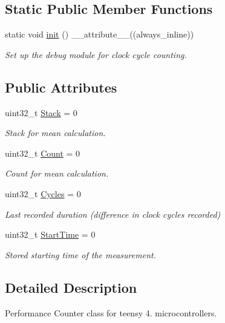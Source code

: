 \subsection*{Static Public Member Functions}
\begin{DoxyCompactItemize}
\item 
static void \hyperlink{classPerfCounter_ae1897d617e84a28c141d554810fcaee9}{init} () \+\_\+\+\_\+attribute\+\_\+\+\_\+((always\+\_\+inline))
\begin{DoxyCompactList}\small\item\em Set up the debug module for clock cycle counting. \end{DoxyCompactList}\end{DoxyCompactItemize}
\subsection*{Public Attributes}
\begin{DoxyCompactItemize}
\item 
uint32\+\_\+t \hyperlink{classPerfCounter_ad440629d44a2bfd9b4d8de185ff66d27}{Stack} = 0
\begin{DoxyCompactList}\small\item\em Stack for mean calculation. \end{DoxyCompactList}\item 
uint32\+\_\+t \hyperlink{classPerfCounter_a8f86300240da2178dea60346ea72651c}{Count} = 0
\begin{DoxyCompactList}\small\item\em Count for mean calculation. \end{DoxyCompactList}\item 
uint32\+\_\+t \hyperlink{classPerfCounter_a60984f26cf145882c0355d28d8233e0a}{Cycles} = 0
\begin{DoxyCompactList}\small\item\em Last recorded duration (difference in clock cycles recorded) \end{DoxyCompactList}\item 
uint32\+\_\+t \hyperlink{classPerfCounter_adefe85b05d9c8920877053f6a8ed743c}{Start\+Time} = 0
\begin{DoxyCompactList}\small\item\em Stored starting time of the measurement. \end{DoxyCompactList}\end{DoxyCompactItemize}


\subsection{Detailed Description}
Performance Counter class for teensy 4. microcontrollers. 

